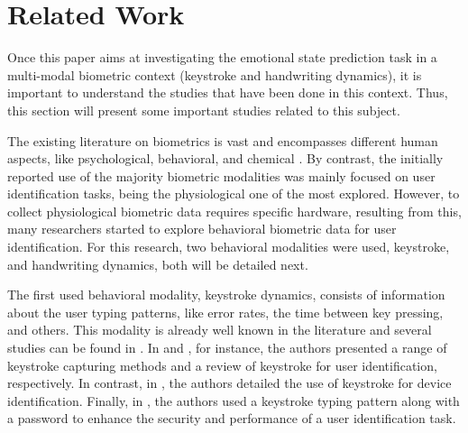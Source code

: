 \documentclass[conference]{IEEEtran}
\begin{document}
\section{Related Work}\label{related-work}

Once this paper aims at investigating the emotional state prediction task in a multi-modal biometric context (keystroke and handwriting dynamics), it is important to understand the studies that have been done in this context. Thus, this section will present some important studies related to this subject.

The existing literature on biometrics is vast and encompasses different human aspects, like psychological, behavioral, and chemical \cite{handbook-biometrics} \cite{handbook-biometrics}. By contrast, the initially reported use of the majority biometric modalities was mainly focused on user identification tasks, being the physiological one of the most explored. However, to collect physiological biometric data requires specific hardware, resulting from this, many researchers started to explore behavioral biometric data for user identification. For this research, two behavioral modalities were used, keystroke, and handwriting dynamics, both will be detailed next.


The first used behavioral modality, keystroke dynamics, consists of information about the user typing patterns, like error rates, the time between key pressing, and others. This modality is already well known in the literature and several studies can be found in \cite{ks-methods,ks-review-ident,ks-id-device,ks-hardenning}. In \cite{ks-methods} and \cite{ks-review-ident}, for instance, the authors presented a range of keystroke capturing methods and a review of keystroke for user identification, respectively. In contrast, in \cite{ks-id-device}, the authors detailed the use of keystroke for device identification. Finally, in \cite{ks-hardenning}, the authors used a keystroke typing pattern along with a password to enhance the security and performance of a user identification task.
\end{document}
